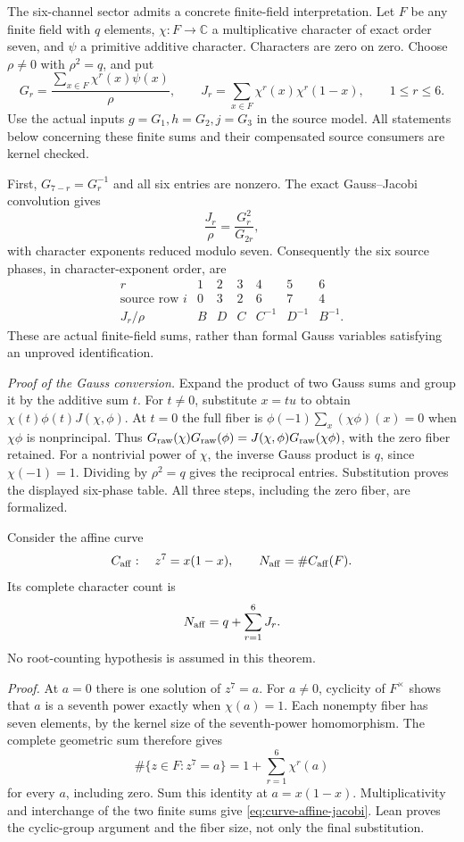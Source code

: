 \documentclass[11pt]{article}
\begin{document}
The six-channel sector admits a concrete finite-field interpretation.
Let $F$ be any finite field with $q$ elements, $\chi:F\to\mathbb C$
a multiplicative character of exact order seven, and $\psi$ a
primitive additive character. Characters are zero on zero. Choose
$\rho\ne0$ with $\rho^2=q$, and put
\[
 G_r=\frac{\sum_{x\in F}\chi^r(x)\psi(x)}{\rho},\qquad
 J_r=\sum_{x\in F}\chi^r(x)\chi^r(1-x),\qquad 1\le r\le6.
\]
Use the actual inputs $g=G_1,h=G_2,j=G_3$ in the source model.
All statements below concerning these finite sums and their
compensated source consumers are kernel checked.

First, $G_{7-r}=G_r^{-1}$ and all six entries are nonzero.
The exact Gauss--Jacobi convolution gives
\[
 \frac{J_r}{\rho}=\frac{G_r^2}{G_{2r}},
\]
with character exponents reduced modulo seven. Consequently the
six source phases, in character-exponent order, are
\[
\begin{array}{c|rrrrrr}
r&1&2&3&4&5&6\\ \hline
\text{source row }i&0&3&2&6&7&4\\
J_r/\rho&B&D&C&C^{-1}&D^{-1}&B^{-1}.
\end{array}
\]
These are actual finite-field sums, rather than formal Gauss
variables satisfying an unproved identification.

\emph{Proof of the Gauss conversion.}
Expand the product of two Gauss sums and group it by the additive
sum $t$. For $t\ne0$, substitute $x=tu$ to obtain
$\chi(t)\phi(t)J(\chi,\phi)$. At $t=0$ the full fiber is
$\phi(-1)\sum_x(\chi\phi)(x)=0$ when $\chi\phi$ is nonprincipal.
Thus $G_{\rm raw}(\chi)G_{\rm raw}(\phi)
=J(\chi,\phi)G_{\rm raw}(\chi\phi)$, with the zero fiber retained.
For a nontrivial power of $\chi$, the inverse Gauss product is $q$,
since $\chi(-1)=1$. Dividing by $\rho^2=q$ gives the reciprocal
entries. Substitution proves the displayed six-phase table.
All three steps, including the zero fiber, are formalized.

Consider the affine curve
\[
 C_{\rm aff}:\quad z^7=x(1-x),\qquad
 N_{\rm aff}=\#C_{\rm aff}(F).
\]
Its complete character count is
\begin{equation}
 N_{\rm aff}=q+\sum_{r=1}^6J_r.
 \label{eq:curve-affine-jacobi}
\end{equation}
No root-counting hypothesis is assumed in this theorem.

\emph{Proof.} At $a=0$ there is one solution of $z^7=a$.
For $a\ne0$, cyclicity of $F^\times$ shows that $a$ is a seventh
power exactly when $\chi(a)=1$. Each nonempty fiber has seven
elements, by the kernel size of the seventh-power homomorphism.
The complete geometric sum therefore gives
\[
 \#\{z\in F:z^7=a\}=1+\sum_{r=1}^6\chi^r(a)
\]
for every $a$, including zero. Sum this identity at $a=x(1-x)$.
Multiplicativity and interchange of the two finite sums give
\eqref{eq:curve-affine-jacobi}. Lean proves the cyclic-group
argument and the fiber size, not only the final substitution.
\end{document}
